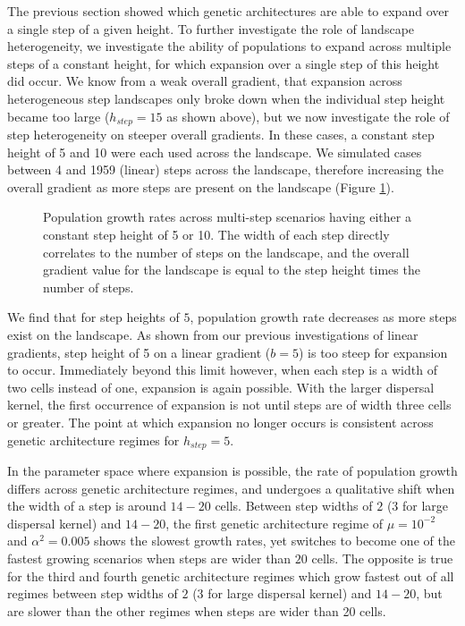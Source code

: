 The previous section showed which genetic architectures are able to expand over a single step of a given height. To further investigate the role of landscape heterogeneity, we investigate the ability of populations to expand across multiple steps of a constant height, for which expansion over a single step of this height did occur. We know from a weak overall gradient, that expansion across heterogeneous step landscapes only broke down when the individual step height became too large ($h_{step} = 15$ as shown above), but we now investigate the role of step heterogeneity on steeper overall gradients. In these cases, a constant step height of 5 and 10 were each used across the landscape. We simulated cases between 4 and 1959 (linear) steps across the landscape, therefore increasing the overall gradient as more steps are present on the landscape (Figure \ref{fig:multistep}).

\begin{figure}[h]
\centering
{}
\caption[Population growth rates across multi-step scenarios.]{Population growth rates across multi-step scenarios having either a constant step height of 5 or 10. The width of each step directly correlates to the number of steps on the landscape, and the overall gradient value for the landscape is equal to the step height times the number of steps.}
\label{fig:multistep}
\end{figure}

We find that for step heights of $5$, population growth rate decreases as more steps exist on the landscape. As shown from our previous investigations of linear gradients, step height of 5 on a linear gradient ($b = 5$) is too steep for expansion to occur. Immediately beyond this limit however, when each step is a width of two cells instead of one, expansion is again possible. With the larger dispersal kernel, the first occurrence of expansion is not until steps are of width three cells or greater. The point at which expansion no longer occurs is consistent across genetic architecture regimes for $h_{step} = 5$.

In the parameter space where expansion is possible, the rate of population growth differs across genetic architecture regimes, and undergoes a qualitative shift when the width of a step is around $14 - 20$ cells. Between step widths of $2$ ($3$ for large dispersal kernel) and $14 - 20$, the first genetic architecture regime of $\mu = 10^{-2}$ and $\alpha^2 = 0.005$ shows the slowest growth rates, yet switches to become one of the fastest growing scenarios when steps are wider than $20$ cells. The opposite is true for the third and fourth genetic architecture regimes which grow fastest out of all regimes between step widths of $2$ ($3$ for large dispersal kernel) and $14 - 20$, but are slower than the other regimes when steps are wider than 20 cells.

